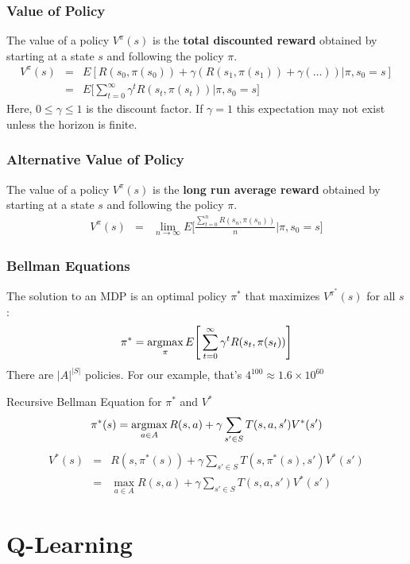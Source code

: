 \documentclass[ignorenonframetext]{beamer}
\newcommand{\argmax}{\operatornamewithlimits{argmax}}
\begin{document}
\begin{frame}
	\frametitle{Value of Policy}
		The value of a policy $V^\pi(s)$ is the \textbf{total discounted
		reward} obtained by starting at a state $s$ and following the
		policy $\pi$.
		\begin{eqnarray*}	
			V^\pi(s) &=& E[R(s_0,\pi(s_0)) + \gamma (R(s_1,\pi(s_1)) + \gamma( \dots
			)) | \pi, s_0 = s]\\
			&=& E \Bigg[\sum_{t=0}^\infty \gamma^t R(s_t,\pi(s_t)) \Big| \pi, s_0 =
			s  \Bigg]
		\end{eqnarray*}	
		Here, $0 \leq \gamma \leq 1$ is the discount factor. If $\gamma =
		1$ this expectation may not exist unless the horizon is finite.
\end{frame}

\begin{frame}
	\frametitle{Alternative Value of Policy}
		The value of a policy $V^\pi(s)$ is the \textbf{long run average
		reward} obtained by starting at a state $s$ and following the
		policy $\pi$.
		\begin{eqnarray*}	
			V^\pi(s) &=& \lim_{n \to \infty} E\Bigg[\frac{\sum_{t=0}^n
			R(s_n,\pi(s_n))}{n}\Big| \pi, s_0 = s\Bigg]
		\end{eqnarray*}	
\end{frame}

\begin{frame}[allowframebreaks]
	\frametitle{Bellman Equations}
	The solution to an MDP is an optimal policy $\pi^*$ that maximizes
	$V^{\pi^*}(s)$ for all $s$:
	\[
	\pi^* = \argmax_{\pi} E\Bigg[\sum_{t=0}^\infty \gamma^t
	R(s_t,\pi(s_t))\Bigg] 
	\]
	There are $|A|^{|S|}$ policies.  For our example, that's $4^{100}
	\approx 1.6\times 10^{60}$

	\begin{block}{Recursive Bellman Equation for $\pi^*$ and $V^*$
		\footnotemark}
		\[
		\pi^*(s) = \argmax_{a\in A} R(s,a) + \gamma \sum_{s'\in S} T(s,a,s')V^*(s')
		\]
		\begin{eqnarray*}
			V^*(s) &=& R(s,\pi^*(s)) + \gamma \sum_{s' \in S}T(s,\pi^*(s),
			s') V^*(s')\\
			&=& \max_{a \in A} R(s,a) + \gamma \sum_{s' \in S}T(s,a, s') V^*(s')
		\end{eqnarray*}
	\end{block}
\end{frame}

\section{Q-Learning}
\end{document}
